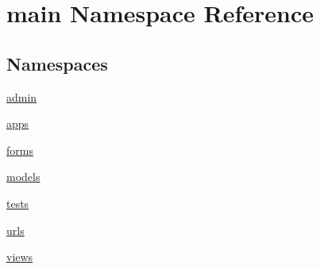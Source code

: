 \hypertarget{namespacemain}{}\section{main Namespace Reference}
\label{namespacemain}
\subsection*{Namespaces}
\begin{DoxyCompactItemize}
\item 
 \hyperlink{namespacemain_1_1admin}{admin}
\item 
 \hyperlink{namespacemain_1_1apps}{apps}
\item 
 \hyperlink{namespacemain_1_1forms}{forms}
\item 
 \hyperlink{namespacemain_1_1models}{models}
\item 
 \hyperlink{namespacemain_1_1tests}{tests}
\item 
 \hyperlink{namespacemain_1_1urls}{urls}
\item 
 \hyperlink{namespacemain_1_1views}{views}
\end{DoxyCompactItemize}
